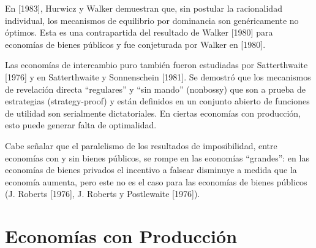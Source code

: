\documentclass[12pt, letterpaper]{article}
\begin{document}
En [1983], Hurwicz y Walker demuestran que, sin postular la racionalidad individual, los mecanismos de equilibrio por dominancia son genéricamente no óptimos. Esta es una contrapartida del resultado de Walker [1980] para economías de bienes públicos y fue conjeturada por Walker en [1980].

Las economías de intercambio puro también fueron estudiadas por Satterthwaite [1976] y en Satterthwaite y Sonnenschein [1981]. Se demostró que los mecanismos de revelación directa ``regulares'' y ``sin mando'' (nonbossy) que son a prueba de estrategias (strategy-proof) y están definidos en un conjunto abierto de funciones de utilidad son serialmente dictatoriales. En ciertas economías con producción, esto puede generar falta de optimalidad.

Cabe señalar que el paralelismo de los resultados de imposibilidad, entre economías con y sin bienes públicos, se rompe en las economías ``grandes'': en las economías de bienes privados el incentivo a falsear disminuye a medida que la economía aumenta, pero este no es el caso para las economías de bienes públicos (J. Roberts [1976], J. Roberts y Postlewaite [1976]).

\section*{Economías con Producción}
\end{document}
